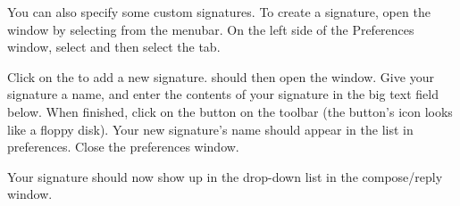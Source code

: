 You can also specify some custom signatures. To create a signature, open
the  window by selecting  from the menubar. On the left side of the  Preferences
window, select  and then select the 
 tab. 

Click on the  to add a new signature. 
should then open the  window. Give your signature a
name, and enter the contents of your signature in the big text field below. 
 When finished,
click on the  button on the toolbar (the button's icon looks like
a floppy disk). Your new signature's name should appear in the list in
preferences. Close the preferences window.

Your signature should now show up in the drop-down list in the compose/reply 
window.

